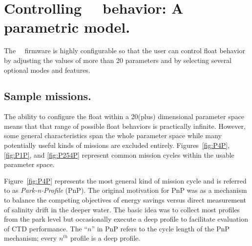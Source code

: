 %
%
%
%
%
%

\newcommand{\Pn}{P$_{N_2}$}

\section{Controlling \iridium\ \apex\ behavior: A parametric model.}
\label{sec:ProfileCycleModel}

The \iridium\ \apex\ firmware is highly configurable so that the user can
control float behavior by adjusting the values of more than 20 parameters
and by selecting several optional modes and features.  

\subsection{Sample missions.}
\label{sec:SampleMissions}

The ability to configure the float within a 20(plus) dimensional parameter
space means that that range of possible float behaviors is practically
infinite.  However, some general characteristics span the whole parameter
space while many potentially useful kinds of missions are excluded
entirely.  Figures~\ref{fig:P4P}, \ref{fig:P1P}, and \ref{fig:P254P}
represent common mission cycles within the usable parameter space.

Figure~\ref{fig:P4P} represents the most general kind of mission cycle and
is referred to as \emph{Park-n-Profile} (PnP).  The original motivation for
PnP was as a mechanism to balance the competing objectives of energy savings
versus direct measurement of salinity drift in the deeper water.  The basic
idea was to collect most profiles from the park level but occasionally
execute a deep profile to facilitate evaluation of CTD performance.  The
``$n$'' in PnP refers to the cycle length of the PnP mechanism; every $n^{th}$
profile is a deep profile.  

